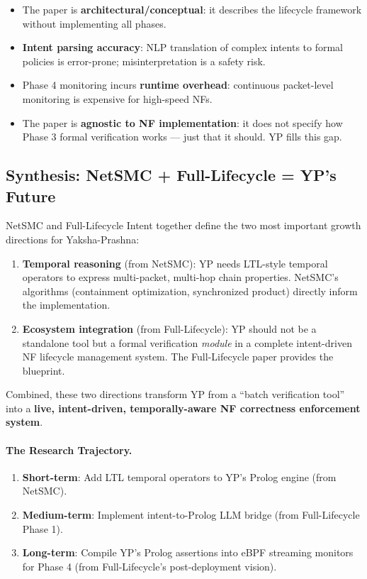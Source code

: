 \begin{limitbox}
\begin{itemize}
  \item The paper is \textbf{architectural/conceptual}: it describes the lifecycle framework without implementing all phases.
  \item \textbf{Intent parsing accuracy}: NLP translation of complex intents to formal policies is error-prone; misinterpretation is a safety risk.
  \item Phase 4 monitoring incurs \textbf{runtime overhead}: continuous packet-level monitoring is expensive for high-speed NFs.
  \item The paper is \textbf{agnostic to NF implementation}: it does not specify how Phase 3 formal verification works --- just that it should. YP fills this gap.
\end{itemize}
\end{limitbox}

\subsection{Synthesis: NetSMC + Full-Lifecycle = YP's Future}

\begin{insightbox}
NetSMC and Full-Lifecycle Intent together define the two most important growth directions for Yaksha-Prashna:

\begin{enumerate}
  \item \textbf{Temporal reasoning} (from NetSMC): YP needs LTL-style temporal operators to express multi-packet, multi-hop chain properties. NetSMC's algorithms (containment optimization, synchronized product) directly inform the implementation.
  \item \textbf{Ecosystem integration} (from Full-Lifecycle): YP should not be a standalone tool but a formal verification \emph{module} in a complete intent-driven NF lifecycle management system. The Full-Lifecycle paper provides the blueprint.
\end{enumerate}

Combined, these two directions transform YP from a ``batch verification tool'' into a \textbf{live, intent-driven, temporally-aware NF correctness enforcement system}.
\end{insightbox}

\paragraph{The Research Trajectory.}
\begin{enumerate}
  \item \textbf{Short-term}: Add LTL temporal operators to YP's Prolog engine (from NetSMC).
  \item \textbf{Medium-term}: Implement intent-to-Prolog LLM bridge (from Full-Lifecycle Phase 1).
  \item \textbf{Long-term}: Compile YP's Prolog assertions into eBPF streaming monitors for Phase 4 (from Full-Lifecycle's post-deployment vision).
\end{enumerate}
